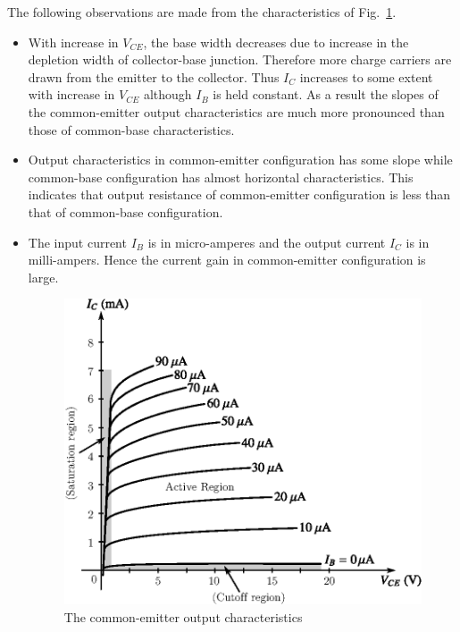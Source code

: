 The following observations are made from the characteristics of Fig.~\ref{fig3.29}.
\begin{itemize}
\item
With increase in $V_{CE}$, the base width decreases due to increase in the depletion width of collector-base junction. Therefore more charge carriers are drawn from the emitter to the collector. Thus $I_{C}$ increases to some extent with increase in $V_{CE}$ although $I_{B}$ is held constant. As a result the slopes of the common-emitter output characteristics are much more pronounced than those of common-base characteristics.


\item Output characteristics in common-emitter configuration has some slope while common-base configuration has almost horizontal characteristics. This indicates that output resistance of common-emitter configuration is less than that of common-base configuration.

\item The input current $I_{B}$ is in micro-amperes and the output current $I_{C}$ is in milli-ampers. Hence the current gain in common-emitter configuration is large.
\begin{figure}[H]
\centering
\includegraphics{chap2/S3-EE-03-029.eps}
\caption{The common-emitter output characteristics}\label{fig3.29}
\end{figure}


\end{itemize}
